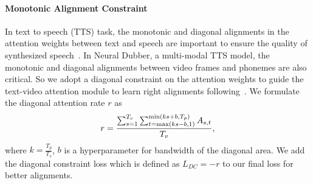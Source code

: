 \documentclass{article}
\begin{document}
\paragraph{Monotonic Alignment Constraint}
In text to speech (TTS) task, the monotonic and diagonal alignments in the attention weights between text and speech are important to ensure the quality of synthesized speech~\cite{wang2017tacotron,shen2018natural,tachibana2018efficiently,chen2020multispeech}. In Neural Dubber, a multi-modal TTS model, the monotonic and diagonal alignments between video frames and phonemes are also critical. So we adopt a diagonal constraint on the attention weights to guide the text-video attention module to learn right alignments following~\cite{chen2020multispeech}.
We formulate the diagonal attention rate $r$ as 
\vspace{-0.3cm}
\begin{equation}
    \label{eq:att_r}
    r=\frac{\sum_{s=1}^{T_v} \sum_{t=\max\left(k s-b,  1\right)}^{\min \left(k s+b, T_p\right)} A_{s,t}}{T_v} ,
\vspace{-0.3cm}
\end{equation}
\vspace{0.0cm}where $k = \frac{T_p}{T_v}$, $b$ is a hyperparameter for bandwidth of the diagonal area.
We add the diagonal constraint loss which is defined as $L_{D C}=-r$ to our final loss for better alignments.
\end{document}
